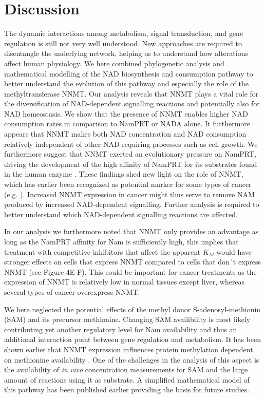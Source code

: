 \section{Discussion}



The dynamic interactions among metabolism, signal transduction, and gene regulation is still not very well understood. New approaches are required to disentangle the underlying network, helping us to understand how alterations affect human physiology. We here combined phylogenetic analysis and mathematical modelling of the NAD biosynthesis and consumption pathway to better understand the evolution of this pathway and  especially the role of the methyltransferase NNMT. Our analysis reveals that NNMT plays a vital role for the diversification of NAD-dependent signalling reactions and potentially also for NAD homeostasis. We show that the presence of NNMT enables higher NAD consumption rates in comparison to NamPRT or NADA alone. It furthermore appears that NNMT makes both NAD concentration and NAD consumption relatively independent of other NAD requiring processes such as cell growth. We furthermore suggest that NNMT exerted an evolutionary pressure on NamPRT, driving the development of the high affinity of NamPRT for its substrates found in the human enzyme \cite{Burgos2008}. These findings shed new light on the role of NNMT, which has earlier been recognized  as potential marker for some types of cancer (e.g. \cite{Okamura1998}).  Increased NNMT expression in cancer might thus serve to remove  NAM produced by increased NAD-dependent signalling. Further analysis is required to better understand which NAD-dependent signalling reactions are affected.

In our analysis we furthermore noted that NNMT only provides an advantage as long as the NamPRT affinity for Nam is sufficiently high, this implies that treatment with competitive inhibitors that affect the apparent $K_M$ would have stronger effects on cells that express NNMT compared to cells that don´t express NNMT (see Figure 4E-F). This could be important for cancer treatments as the expression of NNMT is relatively low in normal tissues except liver, whereas several types of cancer overexpress NNMT.

We here neglected the potential effects of the methyl donor S-adenosyl-methionin (SAM) and its precursor methionine. Changing SAM availibility is most likely contributing yet another regulatory level for Nam availability and thus an additional interaction point between gene regulation and metabolism. It has been shown earlier that NNMT expression influences protein methylation dependent on methionine availability \cite{Ulanovskaya2013}. One of the challenges in the analysis of this aspect is the availability of \textit{in vivo} concentration measurements for SAM and the large amount of reactions using it as substrate.  A simplified mathematical model of this pathway has  been published earlier \cite{PMID14637052}  providing the basis for future studies.

